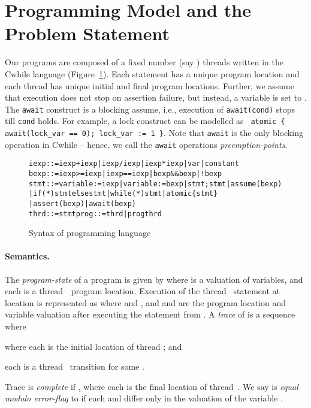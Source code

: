 \documentclass{llncs}
\begin{document}
\section{Programming Model and the Problem Statement}
\label{sec:defs}



Our programs are composed of a fixed number (say ) threads
written in the {\sc Cwhile} language (Figure~\ref{fig:syntax}).
Each statement has a unique program location and each thread has unique
initial and final program locations.
Further, we assume that execution does not stop on assertion
failure, but instead, a variable  is set to .
The {\tt await} construct is a blocking assume, i.e., execution of
{\tt await(cond)} stops till {\tt cond} holds.
For example, a lock construct can be modelled as {\tt
atomic \{  await(lock\_var == 0); lock\_var := 1 \}}.
Note that {\tt await} is the only blocking operation in {\sc Cwhile} --
hence, we call the {\tt await} operations {\em preemption-points}.
\begin{figure} 
  \vspace{1ex}
\begin{alltt}
iexp ::= iexp + iexp | iexp / iexp | iexp * iexp | var | constant
bexp ::= iexp >= iexp | iexp == iexp | bexp && bexp | !bexp
stmt ::= variable := iexp | variable := bexp | stmt; stmt | assume(bexp) 
         | if (*) stmt else stmt | while (*) stmt | atomic \{ stmt \}
         | assert(bexp) | await(bexp)
thrd ::= stmt                               prog  ::= thrd | progthrd
\end{alltt}
\vspace{-4ex}
\caption{Syntax of programming language}
\label{fig:syntax}
\end{figure}

\!\!\!\!\!\!\!\!
\paragraph{Semantics.}
The {\em program-state}  of a program  is given by
 where  is a
valuation of variables, and each  is a thread~~program location.
Execution of the thread~ statement at location  is
represented as  where
 and
,
and  and  are the program location and
variable valuation after executing the statement from . 
A {\em trace}  of  is a sequence  where 
\begin{inparaenum}[(a)]
\item  where each  is the initial location of
  thread ; and
\item each  is a thread~
  transition for some .
\end{inparaenum}
Trace  is {\em complete} if , where each  is the
final location of thread~.
We say  is {\em equal modulo
error-flag} to  if each
 and  differ only in the valuation of the
variable .
\end{document}
